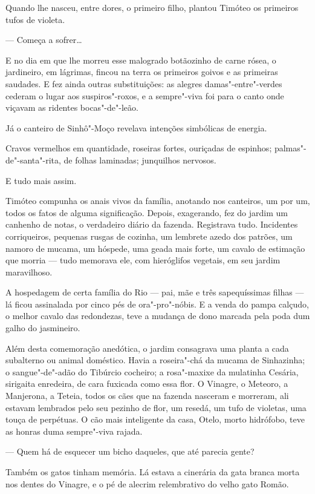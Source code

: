 Quando lhe nasceu, entre dores, o primeiro filho, plantou Timóteo os
primeiros tufos de violeta.

--- Começa a sofrer\ldots{}

E no dia em que lhe morreu esse malogrado botãozinho de carne rósea, o
jardineiro, em lágrimas, fincou na terra os primeiros goivos e as
primeiras saudades. E fez ainda outras substituições: as alegres
damas"-entre"-verdes cederam o lugar aos suspiros"-roxos, e a sempre"-viva
foi para o canto onde viçavam as ridentes bocas"-de"-leão.

Já o canteiro de Sinhô"-Moço revelava intenções simbólicas de energia.

Cravos vermelhos em quantidade, roseiras fortes, ouriçadas de espinhos;
palmas"-de"-santa"-rita, de folhas laminadas; junquilhos nervosos.

E tudo mais assim.

Timóteo compunha os anais vivos da família, anotando nos canteiros, um
por um, todos os fatos de alguma significação. Depois, exagerando, fez
do jardim um canhenho de notas, o verdadeiro diário da fazenda.
Registrava tudo. Incidentes corriqueiros, pequenas rusgas de cozinha, um
lembrete azedo dos patrões, um namoro de mucama, um hóspede, uma geada
mais forte, um cavalo de estimação que morria --- tudo memorava ele, com
hieróglifos vegetais, em seu jardim maravilhoso.

A hospedagem de certa família do Rio --- pai, mãe e três sapequíssimas
filhas --- lá ficou assinalada por cinco pés de ora"-pro"-nóbis. E a venda
do pampa calçudo, o melhor cavalo das redondezas, teve a mudança de dono
marcada pela poda dum galho do jasmineiro.

Além desta comemoração anedótica, o jardim consagrava uma planta a cada
subalterno ou animal doméstico. Havia a roseira"-chá da mucama de
Sinhazinha; o sangue"-de"-adão do Tibúrcio cocheiro; a rosa"-maxixe da
mulatinha Cesária, sirigaita enredeira, de cara fuxicada como essa flor.
O Vinagre, o Meteoro, a Manjerona, a Teteia, todos os cães que na
fazenda nasceram e morreram, ali estavam lembrados pelo seu pezinho de
flor, um resedá, um tufo de violetas, uma touça de perpétuas. O cão mais
inteligente da casa, Otelo, morto hidrófobo, teve as honras duma
sempre"-viva rajada.

--- Quem há de esquecer um bicho daqueles, que até parecia gente?

Também os gatos tinham memória. Lá estava a cinerária da gata branca
morta nos dentes do Vinagre, e o pé de alecrim relembrativo do velho
gato Romão.

